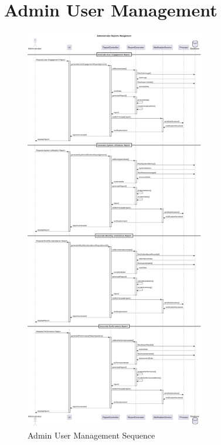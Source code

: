 \documentclass[12pt,a4paper]{report}
\begin{document}
\section{Admin User Management}
\begin{figure}[htbp]
    \centering
    \includegraphics[width=0.7\textwidth]{admin-user-management-sequence.png}
    \caption{Admin User Management Sequence}
    \label{fig:admin-user-management-sequence}
\end{figure}

\newpage
\end{document}
